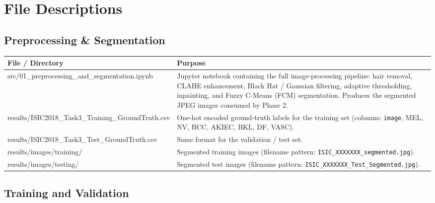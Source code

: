 \documentclass[12pt,a4paper]{report}
\begin{document}
\section{File Descriptions}

\subsection{Preprocessing \& Segmentation}

\begin{longtable}{>{\ttfamily\small}p{7.2cm} p{8cm}}
  \toprule
  \normalfont\textbf{File / Directory} & \textbf{Purpose} \\
  \midrule
  \endhead
  \bottomrule
  \endfoot
  src/01\_preprocessing\_and\_segmentation.ipynb
    & Jupyter notebook containing the full image-processing pipeline: hair removal, CLAHE enhancement, Black Hat / Gaussian filtering, adaptive thresholding, inpainting, and Fuzzy C-Means (FCM) segmentation. Produces the segmented JPEG images consumed by Phase 2. \\[4pt]
  results/ISIC2018\_Task3\_Training\-\_GroundTruth.csv
    & One-hot encoded ground-truth labels for the training set (columns: \texttt{image}, MEL, NV, BCC, AKIEC, BKL, DF, VASC). \\[4pt]
  results/ISIC2018\_Task3\_Test\-\_GroundTruth.csv
    & Same format for the validation / test set. \\[4pt]
  results/images/training/
    & Segmented training images (filename pattern: \texttt{ISIC\_XXXXXXX\_segmented.jpg}). \\[4pt]
  results/images/testing/
    & Segmented test images (filename pattern: \texttt{ISIC\_XXXXXXX\_Test\_Segmented.jpg}). \\
\end{longtable}

\subsection{Training and Validation}
\end{document}

